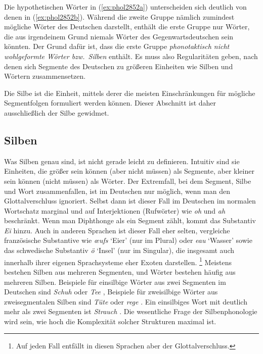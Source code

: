 Die hypothetischen Wörter in (\ref{ex:phol2852a}) unterscheiden sich deutlich von denen in (\ref{ex:phol2852b}).
Während die zweite Gruppe nämlich zumindest mögliche Wörter des Deutschen darstellt, enthält die erste Gruppe nur Wörter, die aus irgendeinem Grund niemals Wörter des Gegenwartsdeutschen sein könnten.
Der Grund dafür ist, dass die erste Gruppe \textit{phonotaktisch nicht wohlgeformte Wörter bzw.\ Silben} enthält.
Es muss also Regularitäten geben, nach denen sich Segmente des Deutschen zu größeren Einheiten wie Silben und Wörtern zusammensetzen.


Die Silbe ist die Einheit, mittels derer die meisten Einschränkungen für mögliche Segmentfolgen formuliert werden können.
Dieser Abschnitt ist daher ausschließlich der Silbe gewidmet.

\subsection{Silben}

\label{sec:silben}


Was Silben genau sind, ist nicht gerade leicht zu definieren.
Intuitiv sind sie Einheiten, die größer sein können (aber nicht müssen) als Segmente, aber kleiner sein können (nicht müssen) als Wörter.
Der Extremfall, bei dem Segment, Silbe und Wort zusammenfallen, ist im Deutschen nur möglich, wenn man den Glottalverschluss ignoriert.
Selbst dann ist dieser Fall im Deutschen im normalen Wortschatz marginal und auf Interjektionen (Rufwörter) wie \textit{oh} \textipa{[Po:]} und \textit{ah} \textipa{[Pa:]} beschränkt.
Wenn man Diphthonge als ein Segment zählt, kommt das Substantiv \textit{Ei} \textipa{[P\t{aE}]} hinzu.
Auch in anderen Sprachen ist dieser Fall eher selten, vergleiche französische Substantive wie \textit{œufs} \textipa{[\o:]} `Eier' (nur im Plural) oder \textit{eau} \textipa{[o:]} `Wasser' sowie das schwedische Substantiv \textit{ö} \textipa{[\oe:]} `Insel' (nur im Singular), die insgesamt auch innerhalb ihrer eigenen Sprachsysteme eher Exoten darstellen.%
\footnote{Auf jeden Fall entfällt in diesen Sprachen aber der Glottalverschluss.} 
Meistens bestehen Silben aus mehreren Segmenten, und Wörter bestehen häufig aus mehreren Silben.
Beispiele für einsilbige Wörter aus zwei Segmenten im Deutschen sind \textit{Schuh} \textipa{[Su:]} oder \textit{Tee} \textipa{[te:]}, Beispiele für zweisilbige Wörter aus zweisegmentalen Silben sind \textit{Tüte} \textipa{[ty:t@]} oder \textit{rege} \textipa{[Ke:g@]}.
Ein einsilbiges Wort mit deutlich mehr als zwei Segmenten ist \textit{Strauch} \textipa{[StK\t{aO}X]}. 
Die wesentliche Frage der Silbenphonologie wird sein, wie hoch die Komplexität solcher Strukturen maximal ist.

